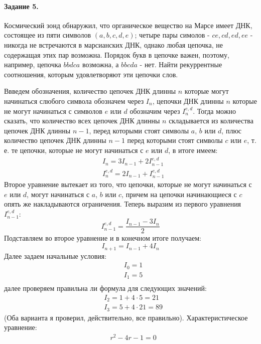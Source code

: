\documentclass[a4paper,12pt]{article}
\begin{document}
\paragraph{Задание 5.} Космический зонд обнаружил, что органическое вещество на Марсе имеет ДНК, состоящее из пяти символов $\left(a,b,c,d,e\right)$; четыре пары симолов - $ce, cd, ed, ee$ - никогда не встречаются в марсианских ДНК, однако любая цепочка, не содержащая этих пар возможна. Порядок букв в цепочке важен, поэтому, например, цепочка $bbdca$ возможна, а $bbcda$ - нет. Найти рекуррентные соотношения, которым удовлетворяют эти цепочки слов.

\begin{Solution}
Ввведем обозначения, количество цепочек ДНК длинны $n$ которые могут начинаться слюбого символа обозначем через $I_n$, цепочки ДНК длинны $n$ которые не могут начинаться с символов $e$ или $d$ обозначим через $I_n^{e,d}$. Тогда можно сказать, что количество всех цепочек ДНК длинны $n$ складывается из количества цепочек ДНК длинны $n-1$, перед которыми стоят символы $a$, $b$ или $d$, плюс количество цепочек ДНК длинны $n-1$ перед которыми стоят символы $c$ или $e$, т. е. те цепочки, которые не могут начинаться с $e$ или $d$, в итоге имеем:
\[
	\begin{split}
		& I_n = 3 I_{n-1} + 2 I_{n-1}^{e,d} \\
		& I_{n}^{e,d} = 2 I_{n-1} + I_{n-1}^{e,d}
	\end{split}
\]
Второе уравнение вытекает из того, что цепочки, которые не могут начинаться с $e$ или $d$, могут начинаться с $a$, $b$ или $c$, причем на цепочки начинающиеся с $c$ опять же накладываются ограничения.
Теперь выразим из первого уравнения $I_{n-1}^{e,d}$:
\[
	I_{n-1}^{e,d} = \frac{I_{n-1} - 3 I_n}{2}
\]
Подставляем во второе уравнение и в конечном итоге получаем:
\[
	I_{n+1} = I_{n-1} + 4 I_n
\]
Далее задаем начальные условия:
\[
	\begin{split}
		& I_0 = 1 \\
		& I_1 = 5 \\
	\end{split}
\]
далее проверяем правильна ли формула для следующих значений:
\[
	\begin{split}
		& I_2 = 1 + 4 \cdot 5 = 21 \\
		& I_3 = 5 + 4 \cdot 21 = 89
	\end{split}
\]
(Оба варианта я проверил, действительно, все правильно).
Характеристическое уравнение:
\[
	\begin{split}
		& r^2 - 4 r - 1 = 0 \\

\end{split}\]
\end{Solution}
\end{document}
